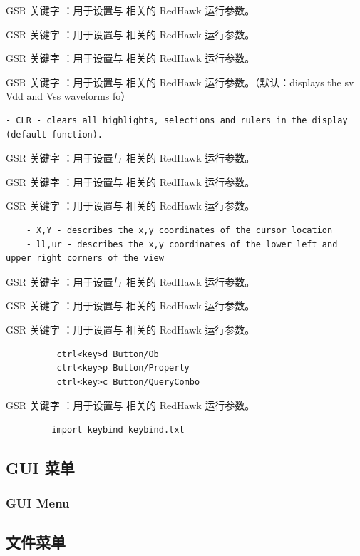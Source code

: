 GSR 关键字 ：用于设置与  相关的 RedHawk 运行参数。

GSR 关键字 ：用于设置与  相关的 RedHawk 运行参数。

GSR 关键字 ：用于设置与  相关的 RedHawk 运行参数。

GSR 关键字 ：用于设置与  相关的 RedHawk 运行参数。（默认：displays the sv Vdd and Vss waveforms fo）

\begin{lstlisting}
- CLR - clears all highlights, selections and rulers in the display (default function).
\end{lstlisting}

GSR 关键字 ：用于设置与  相关的 RedHawk 运行参数。

GSR 关键字 ：用于设置与  相关的 RedHawk 运行参数。

GSR 关键字 ：用于设置与  相关的 RedHawk 运行参数。

\begin{lstlisting}
    - X,Y - describes the x,y coordinates of the cursor location
    - ll,ur - describes the x,y coordinates of the lower left and upper right corners of the view
\end{lstlisting}

GSR 关键字 ：用于设置与  相关的 RedHawk 运行参数。

GSR 关键字 ：用于设置与  相关的 RedHawk 运行参数。

GSR 关键字 ：用于设置与  相关的 RedHawk 运行参数。

\begin{lstlisting}
          ctrl<key>d Button/Ob
          ctrl<key>p Button/Property
          ctrl<key>c Button/QueryCombo
\end{lstlisting}

GSR 关键字 ：用于设置与  相关的 RedHawk 运行参数。

\begin{lstlisting}
         import keybind keybind.txt
\end{lstlisting}

\subsection{GUI 菜单}
\subsubsection*{GUI Menu}

\subsection{文件菜单}
